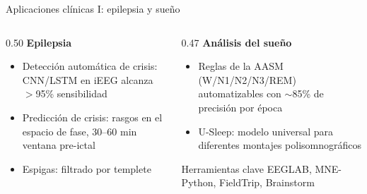 

\begin{frame}{Aplicaciones clínicas I: epilepsia y sueño}
  \begin{columns}[T]
    \begin{column}{0.50\textwidth}
      \textbf{Epilepsia}
      \begin{itemize}
        \item Detección automática de crisis: CNN/LSTM en iEEG
          alcanza $>$95\% sensibilidad \cite{Subasi2005}
        \item Predicción de crisis: rasgos en el espacio de fase, 30--60 min
          ventana pre-ictal
        \item Espigas: filtrado por templete
      \end{itemize}
    \end{column}
    \begin{column}{0.47\textwidth}
      \textbf{Análisis del sueño}
      \begin{itemize}
        \item Reglas de la AASM (W/N1/N2/N3/REM) automatizables con $\sim$85\% de precisión por época
        \item U-Sleep: modelo universal para diferentes montajes polisomnográficos \cite{Perslev2021}
      \end{itemize}
      \vspace{0.3em}
      \begin{block}{Herramientas clave}
        \small EEGLAB, MNE-Python, FieldTrip, Brainstorm
      \end{block}
    \end{column}
  \end{columns}
\end{frame}
